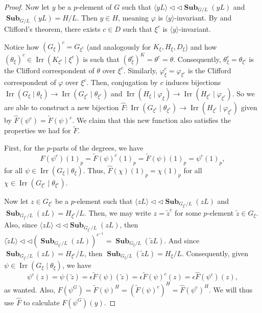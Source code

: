 \documentclass[12pt]{amsart}
\DeclareMathOperator{\Sub}{\mathbf{Sub}}
\DeclareMathOperator{\Irr}{Irr}
\theoremstyle{remark}
\theoremstyle{definition}
\theoremstyle{plain}
\theoremstyle{definition}
\numberwithin{equation}{section}
\begin{document}
\begin{proof}
	Now let $y$ be a $p$-element of $G$ such that $\langle yL \rangle {\triangleleft}{\triangleleft} \Sub_{G/L}(yL)$ and $\Sub_{G/L}(yL) = H/L$. Then $y \in H$, meaning $\varphi$ is $\langle y \rangle$-invariant. By  and Clifford's theorem, there exists $c \in D$ such that $\xi^c$ is $\langle y \rangle$-invariant. 
	
	Notice how $(G_\xi)^c = G_{\xi^c}$ (and analogously for $K_\xi, H_\xi, D_\xi$) and how $(\theta_\xi)^c \in \Irr(K_{\xi^c} \mid \xi^c)$ is such that $(\theta_\xi^c)^K = \theta^c = \theta$. Consequently, $\theta_\xi^c = \theta_{\xi^c}$ is the Clifford correspondent of $\theta$ over $\xi^c$. Similarly, $\varphi_\xi^c = \varphi_{\xi^c}$ is the Clifford correspondent of $\varphi$ over $\xi^c$. Then, conjugation by $c$ induces bijections $\Irr(G_\xi \mid \theta_\xi) \to \Irr(G_{\xi^c} \mid \theta_{\xi^c})$ and $\Irr(H_\xi \mid \varphi_\xi) \to \Irr(H_{\xi^c} \mid \varphi_{\xi^c})$. So we are able to construct a new bijection $\hat{F}: \Irr(G_{\xi^c} \mid \theta_{\xi^c}) \to \Irr(H_{\xi^c} \mid \varphi_{\xi^c})$ given by $\hat{F}(\psi^c) = \tilde{F}(\psi)^c$. We claim that this new function also satisfies the properties we had for $\tilde{F}$.
	
	First, for the $p$-parts of the degrees, we have 
	\begin{equation*}
		\hat{F}(\psi^c)(1)_p = \tilde{F}(\psi)^c(1)_p = \tilde{F}(\psi)(1)_p = \psi^c(1)_p,
	\end{equation*}
	for all $\psi \in \Irr(G_\xi \mid \theta_\xi)$. Thus, $\hat{F}(\chi)(1)_p = \chi(1)_p$ for all $\chi \in \Irr(G_{\xi^c} \mid \theta_{\xi^c})$.
	
	Now let $z \in G_{\xi^c}$ be a $p$-element such that $\langle zL \rangle {\triangleleft}{\triangleleft} \Sub_{G_{\xi^c}/L}(zL)$ and $\Sub_{G_{\xi^c}/L}(zL) = H_{\xi^c}/L$. Then, we may write $z = \tilde{z}^c$ for some $p$-element $\tilde{z} \in G_\xi$. Also, since $\langle zL \rangle {\triangleleft}{\triangleleft} \Sub_{G_{\xi^c}/L}(zL)$, then $\langle \tilde{z}L \rangle {\triangleleft}{\triangleleft} (\Sub_{G_{\xi^c}/L}(zL))^{c^{-1}} = \Sub_{G_\xi/L}(\tilde{z}L)$. And since $\Sub_{G_{\xi^c}/L}(zL) = H_{\xi^c}/L$, then $\Sub_{G_\xi/L}(\tilde{z}L) = H_\xi/L$. Consequently, given $\psi \in \Irr(G_\xi \mid \theta_\xi)$, we have
	\begin{equation*}
		\psi^c(z) = \psi(\tilde{z}) = \epsilon \tilde{F}(\psi)(\tilde{z}) = \epsilon \tilde{F}(\psi)^c(z) = \epsilon \hat{F}(\psi^c)(z),
	\end{equation*} 
	as wanted. Also, $F(\psi^G) = \tilde{F}(\psi)^H = (\tilde{F}(\psi)^c)^H = \hat{F}(\psi^c)^H$. We will thus use $\hat{F}$ to calculate $F(\psi^G)(y)$.
	

\end{proof}
\end{document}

